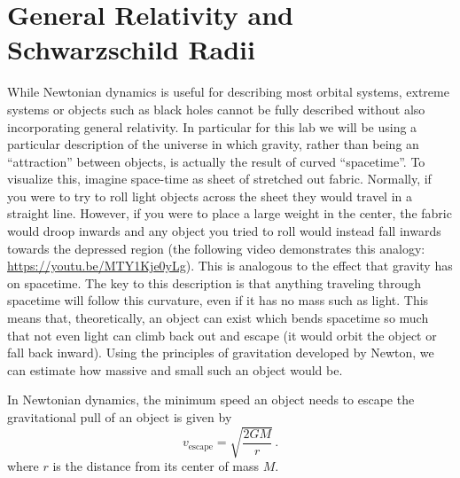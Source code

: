 

\section{General Relativity and Schwarzschild Radii}
While Newtonian dynamics is useful for describing most orbital systems, extreme systems or objects such as black holes cannot be fully described without also incorporating general relativity. In particular for this lab we will be using a particular description of the universe in which gravity, rather than being an ``attraction'' between objects, is actually the result of curved ``spacetime''. To visualize this, imagine space-time as sheet of stretched out fabric. Normally, if you were to try to roll light objects across the sheet they would travel in a straight line. However, if you were to place a large weight in the center, the fabric would droop inwards and any object you tried to roll would instead fall inwards towards the depressed region (the following video demonstrates this analogy: \url{https://youtu.be/MTY1Kje0yLg}). This is analogous to the effect that gravity has on spacetime. The key to this description is that anything traveling through spacetime will follow this curvature, even if it has no mass such as light. This means that, theoretically, an object can exist which bends spacetime so much that not even light can climb back out and escape (it would orbit the object or fall back inward). Using the principles of gravitation developed by Newton, we can estimate how massive and small such an object would be.

In Newtonian dynamics, the minimum speed an object needs to escape the gravitational pull of an object is given by 
\begin{equation}\label{gc:eq:escape-speed}
v_\textrm{escape} = \sqrt{\frac{2 G M}{r}} \,.
\end{equation}
where $r$ is the distance from its center of mass $M$.

